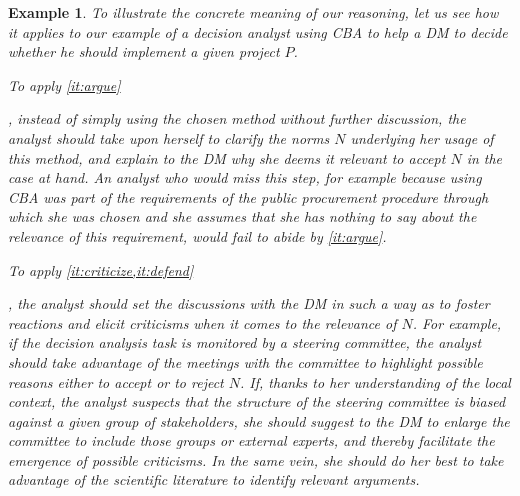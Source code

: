 \documentclass[preprint, french, english, 11pt, authoryear]{elsarticle}%
\newtheorem{example}{Example}
\begin{document}
\begin{example}
To illustrate the concrete meaning of our reasoning, let us see how it applies to our example of a decision analyst using \ac{CBA} to help a \ac{DM} to decide whether he should implement a given project $P$.

\begin{changebar}To apply \cref{it:argue}\end{changebar}, instead of simply using the chosen method without further discussion, the analyst should take upon herself to clarify the norms $N$ underlying her usage of this method, and explain to the \ac{DM} why she deems it relevant to accept $N$ in the case at hand.
An analyst who would miss this step, for example because using \ac{CBA} was part of the requirements of the public procurement procedure through which she was chosen and she assumes that she has nothing to say about the relevance of this requirement, would fail to abide by \cref{it:argue}.
\begin{changebar}To apply \cref{it:criticize,it:defend}\end{changebar}, the analyst should set the discussions with the \ac{DM} in such a way as to foster reactions and elicit criticisms when it comes to the relevance of $N$.
For example, if the decision analysis task is monitored by a steering committee, the analyst should take advantage of the meetings with the committee to highlight possible reasons either to accept or to reject $N$.
If, thanks to her understanding of the local context, the analyst suspects that the structure of the steering committee is biased against a given group of stakeholders, she should suggest to the \ac{DM} to enlarge the committee to include those groups or external experts, 
and thereby facilitate the emergence of possible criticisms.
In the same vein, she should do her best to take advantage of the scientific literature to identify relevant arguments.  




\end{example}
\end{document}
